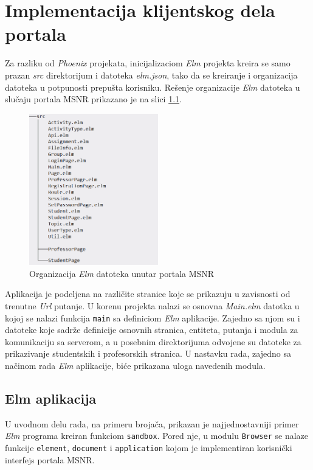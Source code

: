 \documentclass[12pt,oneside]{memoir}
\begin{document}
\chapter{Implementacija klijentskog dela portala}
Za razliku od \emph{Phoenix} projekata, inicijalizaciom \emph{Elm} projekta kreira
se samo prazan \emph{src} direktorijum i datoteka \emph{elm.json}, tako da se kreiranje i
organizacija datoteka u potpunosti prepušta korisniku. Rešenje organizacije \emph{Elm} datoteka u slučaju
portala MSNR prikazano je na slici \ref{fig:msnr-elm-src}.
\begin{figure}[!h]
  \centering
  \includegraphics[width=0.5\textwidth]{msnr-elm-src.png}
  \caption{Organizacija \emph{Elm} datoteka unutar portala MSNR}
  \label{fig:msnr-elm-src}
\end{figure}

Aplikacija je podeljena na različite stranice koje se prikazuju u zavisnosti od trenutne \emph{Url} putanje. 
U korenu projekta nalazi se osnovna \emph{Main.elm} datotka u kojoj se nalazi funkcija \texttt{main} sa definiciom \emph{Elm} aplikacije.
Zajedno sa njom su i datoteke koje sadrže definicije osnovnih stranica, entiteta, putanja i modula za komunikaciju sa serverom, a
u posebnim direktorijuma odvojene su datoteke za prikazivanje studentskih i profesorskih stranica. U nastavku rada, zajedno sa načinom
rada \emph{Elm} aplikacije, biće prikazana uloga navedenih modula.

\section{Elm aplikacija}
U uvodnom delu rada, na primeru brojača, prikazan je najjednostavniji primer \emph{Elm} programa kreiran funkciom \texttt{sandbox}.
Pored nje, u modulu \texttt{Browser} se nalaze funkcije \texttt{element}, \texttt{document} i \texttt{application}
kojom je implementiran korisnički interfejs portala MSNR.
\end{document}
